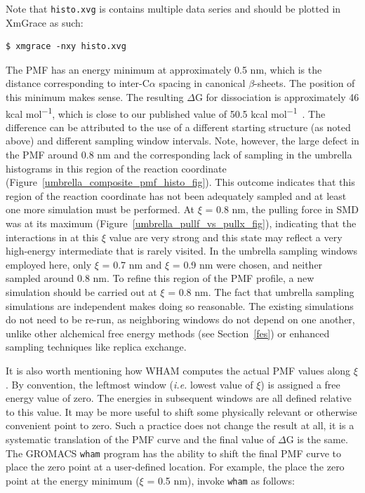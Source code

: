 \documentclass[9pt,tutorial,pubversion]{livecoms}
\begin{document}
Note that \texttt{histo.xvg} is contains multiple data series and should be plotted in XmGrace as such:

\begin{lstlisting}
$ xmgrace -nxy histo.xvg
\end{lstlisting}

The PMF has an energy minimum at approximately 0.5 nm, which is the distance corresponding to inter-C$\alpha$ spacing in canonical $\beta$-sheets. The position of this minimum makes sense. The resulting $\Delta$G for dissociation is approximately 46 kcal mol\textsuperscript{$-$1}, which is close to our published value of 50.5 kcal mol\textsuperscript{$-$1}~\cite{Lemkul2010}. The difference can be attributed to the use of a different starting structure (as noted above) and different sampling window intervals. Note, however, the large defect in the PMF around 0.8 nm and the corresponding lack of sampling in the umbrella histograms in this region of the reaction coordinate (Figure~\ref{umbrella_composite_pmf_histo_fig}). This outcome indicates that this region of the reaction coordinate has not been adequately sampled and at least one more simulation must be performed. At $\xi$ = 0.8 nm, the pulling force in SMD was at its maximum (Figure~\ref{umbrella_pullf_vs_pullx_fig}), indicating that the interactions in at this $\xi$ value are very strong and this state may reflect a very high-energy intermediate that is rarely visited. In the umbrella sampling windows employed here, only $\xi$ = 0.7 nm and $\xi$ = 0.9 nm were chosen, and neither sampled around 0.8 nm. To refine this region of the PMF profile, a new simulation should be carried out at $\xi$ = 0.8 nm. The fact that umbrella sampling simulations are independent makes doing so reasonable. The existing simulations do not need to be re-run, as neighboring windows do not depend on one another, unlike other alchemical free energy methods (see Section~\ref{fes}) or enhanced sampling techniques like replica exchange.

It is also worth mentioning how WHAM computes the actual PMF values along $\xi$. By convention, the leftmost window ({\em i.e.} lowest value of $\xi$) is assigned a free energy value of zero. The energies in subsequent windows are all defined relative to this value. It may be more useful to shift some physically relevant or otherwise convenient point to zero. Such a practice does not change the result at all, it is a systematic translation of the PMF curve and the final value of $\Delta$G is the same. The GROMACS \texttt{wham} program has the ability to shift the final PMF curve to place the zero point at a user-defined location. For example, the place the zero point at the energy minimum ($\xi$ = 0.5 nm), invoke \texttt{wham} as follows:
\end{document}
